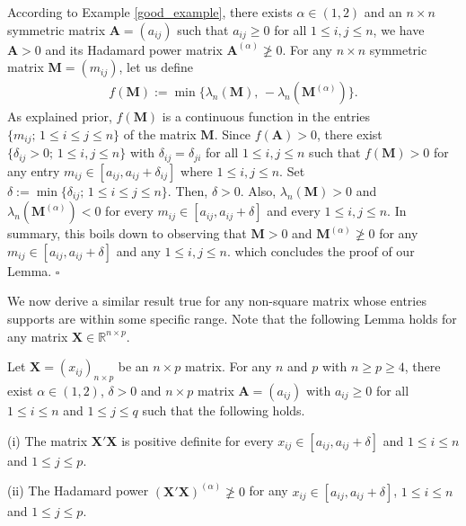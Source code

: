 \documentclass[conference,letterpaper]{IEEEtran}
\numberwithin{equation}{section}
\newcommand{\lbl}{\label}
\newcommand{\beaa}{\begin{eqnarray*}}
\newcommand{\eeaa}{\end{eqnarray*}}
\begin{document}
According to Example \ref{good_example}, there exists  $\alpha\in (1, 2)$ and an $n\times n$ symmetric matrix $\mathbf{A}=(a_{ij})$ such that $a_{ij}\geq 0$ for all $1\leq i, j \leq n$, we have $\mathbf{A}>0$ and its Hadamard power matrix $\mathbf{A}^{(\alpha)} \ngeqslant 0$. 
For any $n\times n$ symmetric matrix  $\mathbf{M}=(m_{ij})$, let us define
\beaa
f(\mathbf{M}):=\min\big\{\lambda_n(\mathbf{M}),\, -\lambda_n(\mathbf{M}^{(\alpha)})\big\}.
\eeaa
As explained prior, $f(\mathbf{M})$ is a continuous function in the entries $\{m_{ij};\, 1\leq i\leq j \leq n\}$ of the matrix $\mathbf{M}$. 
Since $f(\mathbf{A})>0$, there exist $\{\delta_{ij}>0;\, 1\leq i, j\leq n\}$ with $\delta_{ij}=\delta_{ji}$ for all $1\leq i, j\leq n$ such that $f(\mathbf{M})>0$ for any entry $m_{ij}\in [a_{ij}, a_{ij}+\delta_{ij}]$ where $1\leq i, j\leq n$.
Set $\delta := \min\{\delta_{ij};\, 1\leq i\leq j\leq n\}.$ Then, $\delta>0$. Also, $\lambda_n(\mathbf{M})>0$ and $\lambda_n(\mathbf{M}^{(\alpha)})<0$ for every $m_{ij}\in [a_{ij}, a_{ij}+\delta]$ and every $1\leq i, j\leq n.$ 
In summary, this boils down to observing that $\mathbf{M}>0$  and $\mathbf{M}^{(\alpha)} \ngeqslant 0$ for any $m_{ij}\in [a_{ij}, a_{ij}+\delta]$ and any $1\leq i, j\leq n.$ which concludes the proof of our Lemma.
\hfill$\square$
\medskip


We now derive a similar result true for any non-square matrix whose entries supports are within some specific range.
Note that the following Lemma holds for any matrix $\mathbf{X} \in \mathbb{R}^{n \times p}$.
\begin{lem}\lbl{lemma:lem2} Let $\mathbf{X}=(x_{ij})_{n\times p}$ be an $n\times p$ matrix. For any $n$ and $p$ with $n\geq p\geq 4$, there exist $\alpha\in (1,2)$, $\delta>0$ and $n\times p$ matrix  $\mathbf{A}=(a_{ij})$ with $a_{ij}\geq 0$ for all $1\leq i\leq n$ and $1\leq  j \leq q$ such that the following holds.

(i)  The matrix $\mathbf{X}'\mathbf{X}$ is positive definite for every $x_{ij}\in [a_{ij}, a_{ij}+\delta]$ and $1\leq i\leq n$ and $1\leq j \leq p.$

(ii) The Hadamard power $(\mathbf{X}'\mathbf{X})^{(\alpha)}\ngeqslant 0$  for any $x_{ij}\in [a_{ij}, a_{ij}+\delta]$, $1\leq i\leq n$ and $1\leq j \leq p$.
\end{lem}
\medskip
\end{document}
